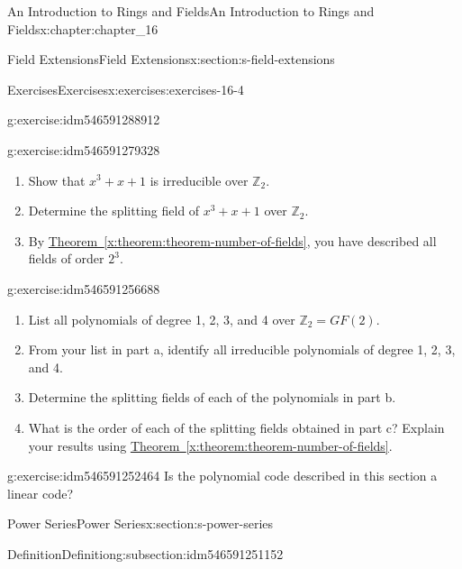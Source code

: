 \documentclass[oneside,10pt,]{book}
\newcommand{\xreffont}{\relax}
\numberwithin{equation}{section}
\begin{document}
\begin{chapterptx}{An Introduction to Rings and Fields}{}{An Introduction to Rings and Fields}{}{}{x:chapter:chapter_16}
\begin{sectionptx}{Field Extensions}{}{Field Extensions}{}{}{x:section:s-field-extensions}
\begin{exercises-subsection}{Exercises}{}{Exercises}{}{}{x:exercises:exercises-16-4}
\begin{divisionexercise}{4}{}{}{g:exercise:idm546591288912}
\begin{enumerate}[label=(\alph*)]
\end{enumerate}
%
\end{divisionexercise}%
\begin{divisionexercise}{5}{}{}{g:exercise:idm546591279328}%
%
\begin{enumerate}[label=(\alph*)]
\item{}Show that \(x^3+ x + 1\) is irreducible over \(\mathbb{Z}_2\).%
\item{}Determine the splitting field of \(x^3+ x + 1\) over \(\mathbb{Z}_2\).%
\item{}By \hyperref[x:theorem:theorem-number-of-fields]{Theorem~{\xreffont\ref{x:theorem:theorem-number-of-fields}}}, you have described all fields of order \(2^3\).%
\end{enumerate}
%
\end{divisionexercise}%
\begin{divisionexercise}{6}{}{}{g:exercise:idm546591256688}%
%
\begin{enumerate}[label=(\alph*)]
\item{}List all polynomials of degree 1, 2, 3, and 4 over \(\mathbb{Z}_2 = GF(2)\).%
\item{}From your list in part a, identify all irreducible polynomials of degree 1, 2, 3, and 4.%
\item{}Determine the splitting fields of each of the polynomials in part b.%
\item{}What is the order of each of the splitting fields obtained in part c? Explain your results using \hyperref[x:theorem:theorem-number-of-fields]{Theorem~{\xreffont\ref{x:theorem:theorem-number-of-fields}}}.%
\end{enumerate}
%
\end{divisionexercise}%
\begin{divisionexercise}{7}{}{}{g:exercise:idm546591252464}%
Is the polynomial code described in this section a linear code?%
\end{divisionexercise}%
\end{exercises-subsection}
\end{sectionptx}
%
%
\typeout{************************************************}
\typeout{************************************************}
%
\begin{sectionptx}{Power Series}{}{Power Series}{}{}{x:section:s-power-series}
%
%
\typeout{************************************************}
\typeout{************************************************}
%
\begin{subsectionptx}{Definition}{}{Definition}{}{}{g:subsection:idm546591251152}

\end{subsectionptx}
\end{sectionptx}
\end{chapterptx}
\end{document}
